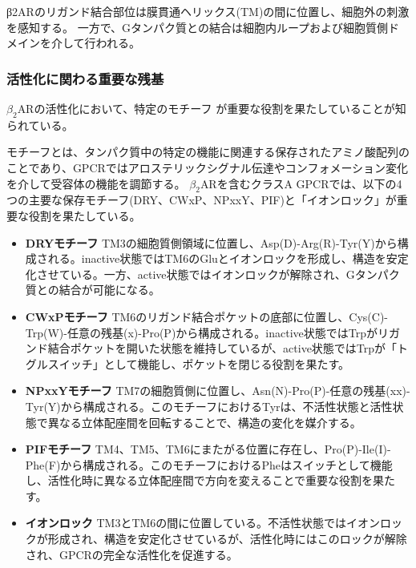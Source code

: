 β2ARのリガンド結合部位は膜貫通ヘリックス(TM)の間に位置し、細胞外の刺激を感知する。
一方で、Gタンパク質との結合は細胞内ループおよび細胞質側ドメインを介して行われる。


\subsubsection{活性化に関わる重要な残基}
$\beta_2$ARの活性化において、特定のモチーフ\cite{nygaard2009ligand}\cite{lee2013mapping}
が重要な役割を果たしていることが知られている。

モチーフとは、タンパク質中の特定の機能に関連する保存されたアミノ酸配列のことであり、GPCRではアロステリックシグナル伝達やコンフォメーション変化を介して受容体の機能を調節する。
$\beta_2$ARを含むクラスA GPCRでは、以下の4つの主要な保存モチーフ(DRY、CWxP、NPxxY、PIF)と「イオンロック」が重要な役割を果たしている。

\begin{itemize}
  \item \textbf{DRYモチーフ}  
  TM3の細胞質側領域に位置し、Asp(D)-Arg(R)-Tyr(Y)から構成される。inactive状態ではTM6のGluとイオンロックを形成し、構造を安定化させている。一方、active状態ではイオンロックが解除され、Gタンパク質との結合が可能になる。

  \item \textbf{CWxPモチーフ}  
  TM6のリガンド結合ポケットの底部に位置し、Cys(C)-Trp(W)-任意の残基(x)-Pro(P)から構成される。inactive状態ではTrpがリガンド結合ポケットを開いた状態を維持しているが、active状態ではTrpが「トグルスイッチ」として機能し、ポケットを閉じる役割を果たす。

  \item \textbf{NPxxYモチーフ}  
  TM7の細胞質側に位置し、Asn(N)-Pro(P)-任意の残基(xx)-Tyr(Y)から構成される。このモチーフにおけるTyrは、不活性状態と活性状態で異なる立体配座間を回転することで、構造の変化を媒介する。

  \item \textbf{PIFモチーフ}  
  TM4、TM5、TM6にまたがる位置に存在し、Pro(P)-Ile(I)-Phe(F)から構成される。このモチーフにおけるPheはスイッチとして機能し、活性化時に異なる立体配座間で方向を変えることで重要な役割を果たす。

  \item \textbf{イオンロック}  
  TM3とTM6の間に位置している。不活性状態ではイオンロックが形成され、構造を安定化させているが、活性化時にはこのロックが解除され、GPCRの完全な活性化を促進する。
\end{itemize}


